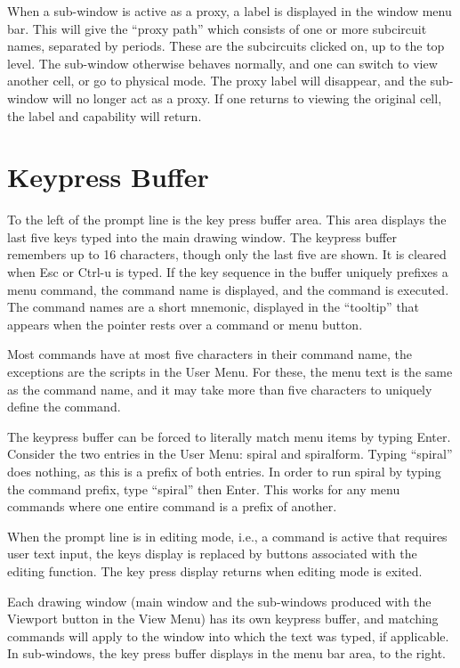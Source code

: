 When a sub-window is active as a proxy, a label is displayed in the
window menu bar.  This will give the ``proxy path'' which consists of
one or more subcircuit names, separated by periods.  These are the
subcircuits clicked on, up to the top level.  The sub-window otherwise
behaves normally, and one can switch to view another cell, or go to
physical mode.  The proxy label will disappear, and the sub-window
will no longer act as a proxy.  If one returns to viewing the original
cell, the label and capability will return.


\section{Keypress Buffer}
To the left of the prompt line is the key press buffer area.  This
area displays the last five keys typed into the main drawing window. 
The keypress buffer remembers up to 16 characters, though only the
last five are shown.  It is cleared when {\kb Esc} or {\kb Ctrl-u} is
typed.  If the key sequence in the buffer uniquely prefixes a menu
command, the command name is displayed, and the command is executed. 
The command names are a short mnemonic, displayed in the ``tooltip''
that appears when the pointer rests over a command or menu button.

Most commands have at most five characters in their command name, the
exceptions are the scripts in the {\cb User Menu}.  For these, the
menu text is the same as the command name, and it may take more than
five characters to uniquely define the command.

The keypress buffer can be forced to literally match menu items by
typing {\kb Enter}.  Consider the two entries in the {\cb User Menu}: 
{\cb spiral} and {\cb spiralform}.  Typing ``spiral'' does nothing,
as this is a prefix of both entries.  In order to run spiral by typing
the command prefix, type ``spiral'' then {\kb Enter}.  This works for
any menu commands where one entire command is a prefix of another.

When the prompt line is in editing mode, i.e., a command is active
that requires user text input, the keys display is replaced by buttons
associated with the editing function.  The key press display returns
when editing mode is exited.

Each drawing window (main window and the sub-windows produced with the
{\cb Viewport} button in the {\cb View Menu}) has its own keypress
buffer, and matching commands will apply to the window into which the
text was typed, if applicable.  In sub-windows, the key press buffer
displays in the menu bar area, to the right.


